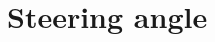 \documentclass[10pt,journal,draftclsnofoot,onecolumn]{IEEEtran}
\newcommand\1{\vec 1}
\begin{document}
% 

% 
% 
% 





\appendices

\section{Steering angle}\label{appendix:steering_angles}
\end{document}
